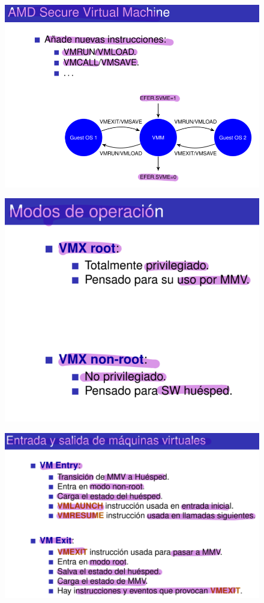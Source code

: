 \documentclass[12pt, twoside, openright]{report} %
\begin{document}
\begin{itemize}
\begin{figure}[H]
      {\includegraphics[scale=.4]{Untitled 41.png}}
    \end{figure}
    \begin{figure}[H]
      {\includegraphics[scale=.4]{Untitled 42.png}}
    \end{figure}
    \begin{figure}[H]
      {\includegraphics[scale=.4]{Untitled 43.png}}

\end{figure}
\end{itemize}
\end{document}
